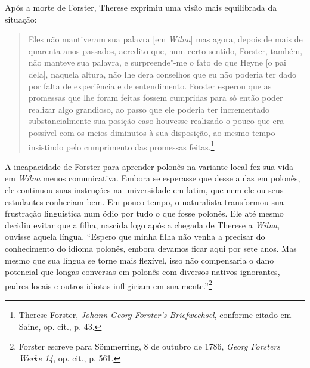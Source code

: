 Após a morte de Forster, Therese exprimiu uma visão mais equilibrada da
situação:

\begin{quote}
Eles não mantiveram sua palavra {[}em \textit{Wilna}{]} mas agora, depois de mais
de quarenta anos passados, acredito que, num certo sentido, Forster,
também, não manteve sua palavra, e surpreende"-me o fato de que Heyne
{[}o pai dela{]}, naquela altura, não lhe dera conselhos que eu não
poderia ter dado por falta de experiência e de entendimento. Forster
esperou que as promessas que lhe foram feitas fossem cumpridas para só
então poder realizar algo grandioso, ao passo que ele poderia ter
incrementado substancialmente sua posição caso houvesse realizado o
pouco que era possível com os meios diminutos à sua disposição, ao mesmo
tempo insistindo pelo cumprimento das promessas feitas.\footnote{Therese Forster, \textit{Johann Georg Forster's Briefwechsel}, conforme citado em Saine, op. cit., p. 43.} 
\end{quote}


A incapacidade de Forster para aprender polonês na variante local fez
sua vida em \textit{Wilna} menos comunicativa. Embora se esperasse que desse
aulas em polonês, ele continuou suas instruções na universidade em
latim, que nem ele ou seus estudantes conheciam bem. Em pouco tempo, o
naturalista transformou sua frustração linguística num ódio por tudo o
que fosse polonês. Ele até mesmo decidiu evitar que a filha, nascida
logo após a chegada de Therese a \textit{Wilna}, ouvisse aquela língua. ``Espero
que minha filha não venha a precisar do conhecimento do idioma polonês,
embora devamos ficar aqui por sete anos. Mas mesmo que sua língua se
torne mais flexível, isso não compensaria o dano potencial que longas
conversas em polonês com diversos nativos ignorantes, padres locais e
outros idiotas infligiriam em sua mente.''\footnote{Forster escreve para Sömmerring, 8 de outubro de 1786, \textit{Georg Forsters Werke 14}, op. cit., p. 561.}

